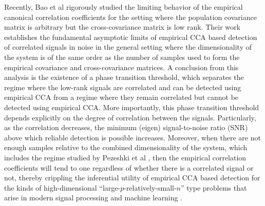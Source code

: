 Recently, Bao et al \cite{bao2014canonical} rigorously studied the limiting behavior of
the empirical canonical correlation coefficients for the setting where the population
covariance matrix is arbitrary but the cross-covariance matrix is low rank. Their work
establishes the fundamental asymptotic limits of empirical CCA based detection of
correlated signals in noise in the general setting where the dimensionality of the system
is of the same order as the number of samples used to form the empirical covariance and
cross-covariance matrices. A conclusion from this analysis is the existence of a phase
transition threshold, which separates the regime where the low-rank signals are correlated
and can be detected using empirical CCA from a regime where they remain correlated but
cannot be detected using empirical CCA. More importantly, this phase transition threshold
depends explicitly on the degree of correlation between the signals. Particularly, as the
correlation decreases, the minimum (eigen) signal-to-noise ratio (SNR) above which
reliable detection is possible increases. Moreover, when there are not enough samples
relative to the combined dimensionality of the system, which includes the regime studied
by Pezeshki et al \cite{pezeshki2004empirical}, then the empirical correlation
coefficients will tend to one regardless of whether there is a correlated signal or not,
thereby crippling the inferential utility of empirical CCA based detection for the kinds
of high-dimensional ``large-$p$-relatively-small-$n$'' type problems that arise in modern
signal processing and machine learning
\cite{johnstone2008multivariate,fujikoshi2009high,wainwright2009sharp,yang2015computational,janson2015eigenprism}.

